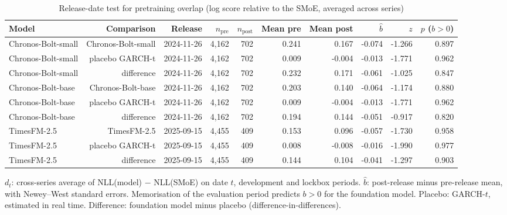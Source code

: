 \begin{table}[!htbp]\centering\footnotesize
\caption{Release-date test for pretraining overlap (log score relative to the SMoE, averaged across series)}\label{tab:fm-release}
\begin{adjustbox}{max width=\textwidth}
\begin{tabular}{lrrrrrrrrr}
\toprule
Model & Comparison & Release & $n_{\text{pre}}$ & $n_{\text{post}}$ & Mean pre & Mean post & $\hat b$ & $z$ & $p$ ($b>0$)\\
\midrule
Chronos-Bolt-small & Chronos-Bolt-small & 2024-11-26 & 4,162 & 702 & 0.241 & 0.167 & -0.074 & -1.266 & 0.897\\
Chronos-Bolt-small & placebo GARCH-t & 2024-11-26 & 4,162 & 702 & 0.009 & -0.004 & -0.013 & -1.771 & 0.962\\
Chronos-Bolt-small & difference & 2024-11-26 & 4,162 & 702 & 0.232 & 0.171 & -0.061 & -1.025 & 0.847\\
Chronos-Bolt-base & Chronos-Bolt-base & 2024-11-26 & 4,162 & 702 & 0.203 & 0.140 & -0.064 & -1.174 & 0.880\\
Chronos-Bolt-base & placebo GARCH-t & 2024-11-26 & 4,162 & 702 & 0.009 & -0.004 & -0.013 & -1.771 & 0.962\\
Chronos-Bolt-base & difference & 2024-11-26 & 4,162 & 702 & 0.194 & 0.144 & -0.051 & -0.917 & 0.820\\
TimesFM-2.5 & TimesFM-2.5 & 2025-09-15 & 4,455 & 409 & 0.153 & 0.096 & -0.057 & -1.730 & 0.958\\
TimesFM-2.5 & placebo GARCH-t & 2025-09-15 & 4,455 & 409 & 0.008 & -0.008 & -0.016 & -1.990 & 0.977\\
TimesFM-2.5 & difference & 2025-09-15 & 4,455 & 409 & 0.144 & 0.104 & -0.041 & -1.297 & 0.903\\
\bottomrule
\end{tabular}
\end{adjustbox}
\par\smallskip\begin{minipage}{\textwidth}\footnotesize
$d_t$: cross-series average of NLL(model) $-$ NLL(SMoE) on date $t$, development and lockbox periods. $\hat b$: post-release minus pre-release mean, with Newey--West standard errors. Memorisation of the evaluation period predicts $b>0$ for the foundation model. Placebo: GARCH-$t$, estimated in real time. Difference: foundation model minus placebo (difference-in-differences).
\end{minipage}
\end{table}